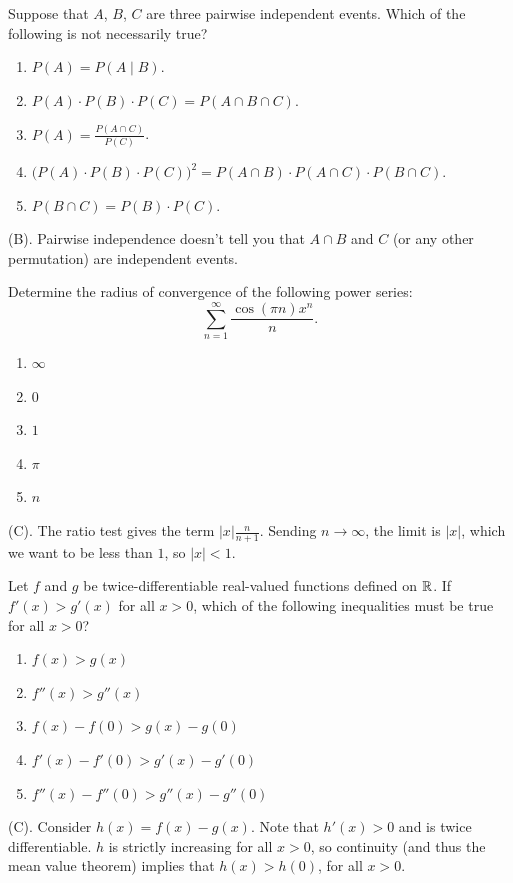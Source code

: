 \begin{exercise}
Suppose that $A$, $B$, $C$ are three pairwise independent events. 
Which of the following is not necessarily true?
\begin{enumerate}[label=(\Alph*)]
    \item $P(A)=P(A\mid B)$.
    \item $P(A)\cdot P(B)\cdot P(C)=P(A\cap B\cap C)$.
    \item $P(A)=\frac{P(A\cap C)}{P(C)}$.
    \item $\bigl(P(A)\cdot P(B)\cdot P(C)\bigr)^2
    =P(A\cap B)\cdot P(A\cap C)\cdot P(B\cap C)$.
    \item $P(B\cap C)=P(B)\cdot P(C)$.
\end{enumerate}
\end{exercise}
\begin{solution}
(B). Pairwise independence doesn't tell you that $A \cap B$ and $C$ 
(or any other permutation) are independent events.
\end{solution}

\begin{exercise}
Determine the radius of convergence of the following power series:
\[
\sum_{n=1}^{\infty}\frac{\cos(\pi n)x^n}{n}.
\]
\begin{enumerate}[label=(\alph*)]
    \item $\infty$
    \item $0$
    \item $1$
    \item $\pi$
    \item $n$
\end{enumerate}
\end{exercise}
\begin{solution}
(C). The ratio test gives the term $|x| \frac{n}{n + 1}$. Sending 
$n \rightarrow \infty$, the limit is $|x|$, which we want to be less 
than $1$, so $|x| < 1$.
\end{solution}

\begin{exercise}
Let $f$ and $g$ be twice-differentiable real-valued functions defined on
$\mathbb{R}$. If $f'(x)>g'(x)$ for all $x>0$, which of the following
inequalities must be true for all $x>0$?
\begin{enumerate}[label=(\Alph*)]
    \item $f(x)>g(x)$
    \item $f''(x)>g''(x)$
    \item $f(x)-f(0)>g(x)-g(0)$
    \item $f'(x)-f'(0)>g'(x)-g'(0)$
    \item $f''(x)-f''(0)>g''(x)-g''(0)$
\end{enumerate}
\end{exercise}
\begin{solution}
(C). Consider $h(x) = f(x) - g(x)$. Note that $h'(x) > 0$ and is twice differentiable.
$h$ is strictly increasing for all $x > 0$, so continuity (and thus the mean 
value theorem) implies that $h(x) > h(0)$, for all $x > 0$. 
\end{solution}

